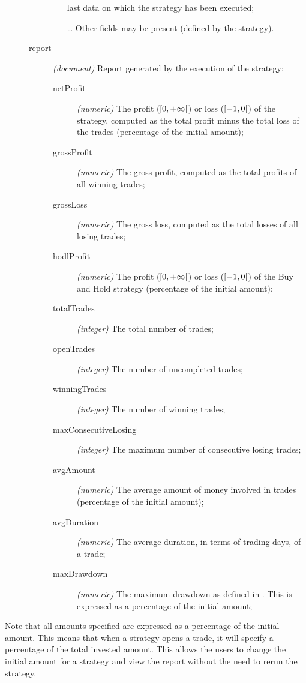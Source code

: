 \begin{description}
\begin{description}
\begin{itemize}
						last data on which the strategy
						has been executed;
					\item[\ldots] Other fields may be
						present (defined by the
						strategy).
				\end{itemize}
			\item[report] \textit{(document)} Report generated by
				the execution of the strategy:
				\begin{description}
					\item[netProfit] \textit{(numeric)} The
						profit (\(\interval[open
						right]{0}{+\infty}\)) or loss
						(\(\interval[open
						right]{-1}{0}\)) of the
						strategy, computed as the total
						profit minus the total loss of
						the trades (percentage of the
						initial amount);
					\item[grossProfit] \textit{(numeric)}
						The gross profit, computed as
						the total profits of all winning
						trades;
					\item[grossLoss] \textit{(numeric)} The
						gross loss, computed as the
						total losses of all losing
						trades;
					\item[hodlProfit] \textit{(numeric)} The
						profit (\(\interval[open
						right]{0}{+\infty}\)) or loss
						(\(\interval[open
						right]{-1}{0}\)) of the Buy and
						Hold strategy (percentage of the
						initial amount);
					\item[totalTrades] \textit{(integer)}
						The total number of trades;
					\item[openTrades] \textit{(integer)} The
						number of uncompleted trades;
					\item[winningTrades] \textit{(integer)}
						The number of winning trades;
					\item[maxConsecutiveLosing]
						\textit{(integer)} The maximum
						number of consecutive losing
						trades;
					\item[avgAmount] \textit{(numeric)} The
						average amount of money involved
						in trades (percentage of the
						initial amount);
					\item[avgDuration] \textit{(numeric)}
						The average duration, in terms
						of trading days, of a trade;
					\item[maxDrawdown] \textit{(numeric)}
						The maximum drawdown as defined
						in . This is
						expressed as a percentage of the
						initial amount;
				\end{description}
		\end{description}
\end{description}

Note that all amounts specified are expressed as a percentage of the initial
amount. This means that when a strategy opens a trade, it will specify a
percentage of the total invested amount. This allows the users to change the
initial amount for a strategy and view the report without the need to rerun the
strategy.
